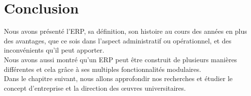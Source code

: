 \section{Conclusion}
Nous avons présenté l'\acs{ERP}, sa définition, son histoire au cours des années en plus des avantages, que ce sois dans l'aspect administratif ou opérationnel, et des inconvénients qu'il peut apporter.\\

Nous avons aussi montré qu'un \acs{ERP} peut être construit de plusieurs manières différentes et cela grâce à ses multiples fonctionnalités modulaires.\\

Dans le chapitre suivant, nous allons approfondir nos recherches et étudier le concept d'entreprise et la direction des œuvres universitaires.\\